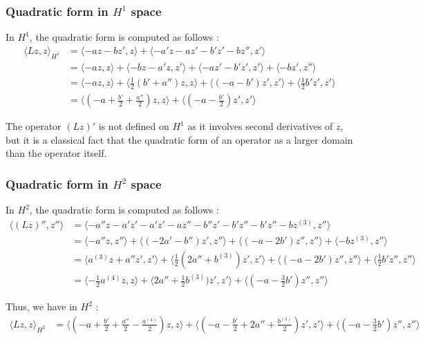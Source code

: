 \documentclass[11pt,a4paper]{article}
\begin{document}
\subsubsection{Quadratic form in $H^1$ space}
In $H^1$, the quadratic form is computed as follows :
\begin{align*}
  \langle Lz, z \rangle_{H^1}   &=   \langle -az - bz', z \rangle +  \langle -a'z-az' - b'z'-bz'', z' \rangle \\
  &=  \langle -az, z \rangle + \langle -bz - a'z, z' \rangle + \langle - az'-b'z', z' \rangle + \langle - bz', z'' \rangle \\
  &=  \langle -az, z \rangle + \langle \frac{1}{2}(b'+a'')z, z \rangle + \langle (-a-b')z', z' \rangle + \langle \frac{1}{2} b' z', z' \rangle \\
  &=  \langle (-a+ \frac{b'}{2}+\frac{a''}{2})z, z \rangle +  \langle (-a-\frac{b'}{2})z', z' \rangle 
\end{align*}

\begin{rmq}
The operator $(Lz)'$ is not defined on $H^1$ as it involves second derivatives of $z$, but it is a classical fact that the quadratic form of an operator as a larger domain than the operator itself.
\end{rmq}

\subsubsection{Quadratic form in $H^2$ space}
In $H^2$, the quadratic form is computed as follows :
\begin{align*}
  \langle (Lz)'', z'' \rangle   &=    \langle -a''z-a'z'-a'z'-az''- b''z'-b'z''-b'z''-bz^{(3)}, z'' \rangle \\
  &= \langle -a''z, z'' \rangle +  \langle (-2a'- b'')z', z'' \rangle +  \langle (-a-2b')z'', z'' \rangle + \langle -bz^{(3)}, z'' \rangle \\
  &= \langle a^{(3)}z+ a''z', z' \rangle +  \langle \frac{1}{2} (2a''+ b^{(3)})z', z' \rangle +  \langle (-a-2b')z'', z'' \rangle + \langle \frac{1}{2} b'z'', z'' \rangle \\
  &= \langle - \frac{1}{2}a^{(4)}z, z \rangle +  \langle 2a''+ \frac{1}{2} b^{(3)})z', z' \rangle +  \langle (-a- \frac{3}{2} b')z'', z'' \rangle 
\end{align*}

Thus, we have in $H^2$ :
\begin{align*}
  \langle Lz, z \rangle_{H^2}   &=  \langle (-a+ \frac{b'}{2}+\frac{a''}{2}-\frac{a^{(4)}}{2})z, z \rangle +  \langle (-a-\frac{b'}{2} +2a''+ \frac{ b^{(3)}}{2})z', z' \rangle +  \langle (-a- \frac{3}{2} b')z'', z'' \rangle 
\end{align*}
\end{document}

